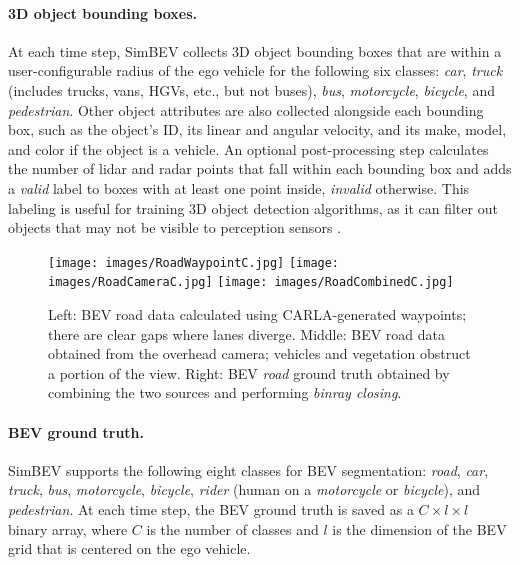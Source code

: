 \paragraph{3D object bounding boxes.} \label{par:bev-bbox}

At each time step, SimBEV collects 3D object bounding boxes that are within a user-configurable radius of the ego vehicle for the following six classes: \textit{car}, \textit{truck} (includes trucks, vans, HGVs, etc., but not buses), \textit{bus}, \textit{motorcycle}, \textit{bicycle}, and \textit{pedestrian}. Other object attributes are also collected alongside each bounding box, such as the object's ID, its linear and angular velocity, and its make, model, and color if the object is a vehicle. An optional post-processing step calculates the number of lidar and radar points that fall within each bounding box and adds a \textit{valid} label to boxes with at least one point inside, \textit{invalid} otherwise. This labeling is useful for training 3D object detection algorithms, as it can filter out objects that may not be visible to perception sensors \cite{caesar2020nuscenes}.

\begin{figure*}[t]
    \centering
    \texttt{[image: images/RoadWaypointC.jpg]}
    \texttt{[image: images/RoadCameraC.jpg]}
    \texttt{[image: images/RoadCombinedC.jpg]}
    \setlength{\abovecaptionskip}{8 pt}
    \setlength{\belowcaptionskip}{-8 pt}
    \caption{Left: BEV road data calculated using CARLA-generated waypoints; there are clear gaps where lanes diverge. Middle: BEV road data obtained from the overhead camera; vehicles and vegetation obstruct a portion of the view. Right: BEV \textit{road} ground truth obtained by combining the two sources and performing \textit{binray closing}.}\label{fig:road-mask}
\end{figure*}

\paragraph{BEV ground truth.} \label{par:bev-gt}

SimBEV supports the following eight classes for BEV segmentation: \textit{road}, \textit{car}, \textit{truck}, \textit{bus}, \textit{motorcycle}, \textit{bicycle}, \textit{rider} (human on a \textit{motorcycle} or \textit{bicycle}), and \textit{pedestrian}. At each time step, the BEV ground truth is saved as a $C \times l \times l$ binary array, where $C$ is the number of classes and $l$ is the dimension of the BEV grid that is centered on the ego vehicle.

